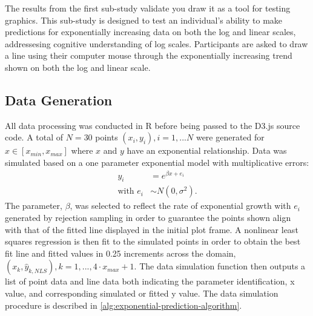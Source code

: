 \documentclass[print]{nuthesis}
\begin{document}
The results from the first sub-study validate you draw it as a tool for testing graphics.
This sub-study is designed to test an individual's ability to make predictions for exponentially increasing data on both the log and linear scales, addressesing cognitive understanding of log scales.
Participants are asked to draw a line using their computer mouse through the exponentially increasing trend shown on both the log and linear scale.

\hypertarget{data-generation-2}{%
\subsection{Data Generation}\label{data-generation-2}}

All data processing was conducted in R before being passed to the D3.js source code.
A total of \(N = 30\) points \((x_i, y_i), i = 1,...N\) were generated for \(x\in [x_{min}, x_{max}]\) where \(x\) and \(y\) have an exponential relationship.
Data was simulated based on a one parameter exponential model with multiplicative errors:
\begin{align}
y_i & = e^{\beta x + e_i} \\
\text{with } e_i & \sim N(0, \sigma^2). \nonumber
\end{align}
The parameter, \(\beta\), was selected to reflect the rate of exponential growth with \(e_i\) generated by rejection sampling in order to guarantee the points shown align with that of the fitted line displayed in the initial plot frame.
A nonlinear least squares regression is then fit to the simulated points in order to obtain the best fit line and fitted values in 0.25 increments across the domain, \((x_k, \hat y_{k,NLS}), k = 1, ..., 4\cdot x_{max} +1\).
The data simulation function then outputs a list of point data and line data both indicating the parameter identification, x value, and corresponding simulated or fitted y value.
The data simulation procedure is described in \cref{alg:exponential-prediction-algorithm}.
\end{document}
